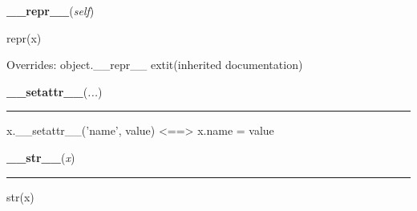     \vspace{0.5ex}

    \begin{boxedminipage}{\textwidth}

    \raggedright \textbf{\_\_repr\_\_}(\textit{self})

    repr(x)

    \vspace{1ex}

      Overrides: object.\_\_repr\_\_ 	extit{(inherited documentation)}

    \end{boxedminipage}

    \label{object:__setattr__}

    \vspace{0.5ex}

    \begin{boxedminipage}{\textwidth}

    \raggedright \textbf{\_\_setattr\_\_}(\textit{...})

    \vspace{-1.5ex}

    \rule{\textwidth}{0.5\fboxrule}
    x.\_\_setattr\_\_('name', value) {\textless}=={\textgreater} x.name = 
    value

    \vspace{1ex}

    \end{boxedminipage}

    \label{object:__str__}

    \vspace{0.5ex}

    \begin{boxedminipage}{\textwidth}

    \raggedright \textbf{\_\_str\_\_}(\textit{x})

    \vspace{-1.5ex}

    \rule{\textwidth}{0.5\fboxrule}
    str(x)

    \vspace{1ex}

    \end{boxedminipage}

    \label{threading:Thread:getName}

    \vspace{0.5ex}

